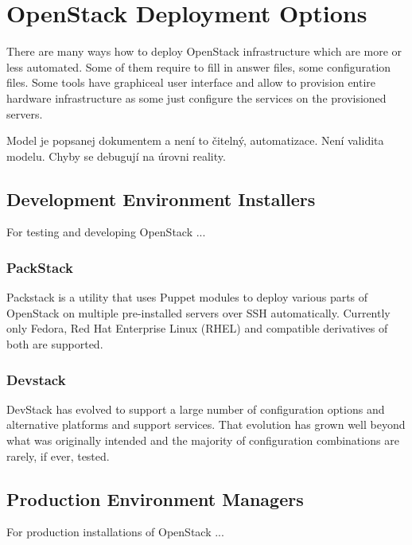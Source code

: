 \section{OpenStack Deployment Options}

There are many ways how to deploy OpenStack infrastructure which are more or less automated. Some of them require to fill in answer files, some configuration files. Some tools have graphiceal user interface and allow to provision entire hardware infrastructure as some just configure the services on the provisioned servers.

Model je popsanej dokumentem a není to čitelný, automatizace. Není validita modelu. Chyby se debugují na úrovni reality.

\subsection{Development Environment Installers}

For testing and developing OpenStack ...

\subsubsection{PackStack}

Packstack is a utility that uses Puppet modules to deploy various parts of OpenStack on multiple pre-installed servers over SSH automatically. Currently only Fedora, Red Hat Enterprise Linux (RHEL) and compatible derivatives of both are supported.


\subsubsection{Devstack}

DevStack has evolved to support a large number of configuration options and alternative platforms and support services. That evolution has grown well beyond what was originally intended and the majority of configuration combinations are rarely, if ever, tested.


\subsection{Production Environment Managers}

For production installations of OpenStack ...

